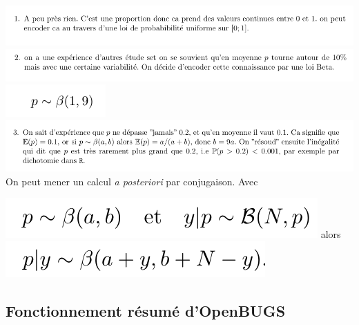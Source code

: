 \includegraphics[scale=0.5]{figures/openbugsjags/beta-bin4.png} \\
\includegraphics[scale=0.5]{figures/openbugsjags/beta-bin5.png} \\
\includegraphics[scale=0.5]{figures/openbugsjags/beta-bin6.png} \\
\includegraphics[scale=0.5]{figures/openbugsjags/beta-bin7.png} \\

On peut mener un calcul {\it a posteriori} par conjugaison. Avec 

 \includegraphics[scale=0.3]{figures/openbugsjags/beta-bin81.png} alors \\
\includegraphics[scale=0.3]{figures/openbugsjags/beta-bin82.png} \\


\subsection{Fonctionnement résumé d'OpenBUGS}

